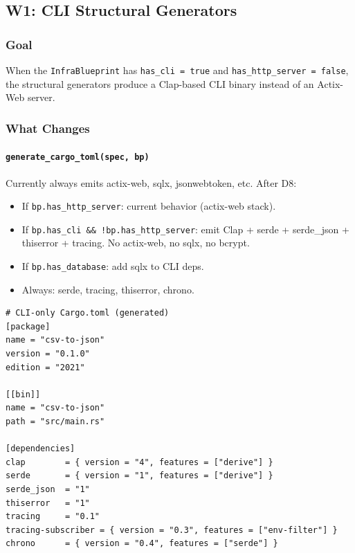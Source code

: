 \documentclass[11pt,a4paper]{article}
\begin{document}
\subsection{W1: CLI Structural Generators}
\label{sec:w1}

\subsubsection{Goal}

When the \texttt{InfraBlueprint} has \texttt{has\_cli = true} and 
\texttt{has\_http\_server = false}, the structural generators produce 
a Clap-based CLI binary instead of an Actix-Web server.

\subsubsection{What Changes}

\paragraph{\texttt{generate\_cargo\_toml(spec, bp)}}

Currently always emits actix-web, sqlx, jsonwebtoken, etc. After D8:

\begin{itemize}[nosep]
\item If \texttt{bp.has\_http\_server}: current behavior (actix-web 
      stack).
\item If \texttt{bp.has\_cli \&\& !bp.has\_http\_server}: emit Clap 
      + serde + serde\_json + thiserror + tracing. No actix-web, 
      no sqlx, no bcrypt.
\item If \texttt{bp.has\_database}: add sqlx to CLI deps.
\item Always: serde, tracing, thiserror, chrono.
\end{itemize}

\begin{lstlisting}[style=toml]
# CLI-only Cargo.toml (generated)
[package]
name = "csv-to-json"
version = "0.1.0"
edition = "2021"

[[bin]]
name = "csv-to-json"
path = "src/main.rs"

[dependencies]
clap        = { version = "4", features = ["derive"] }
serde       = { version = "1", features = ["derive"] }
serde_json  = "1"
thiserror   = "1"
tracing     = "0.1"
tracing-subscriber = { version = "0.3", features = ["env-filter"] }
chrono      = { version = "0.4", features = ["serde"] }
\end{lstlisting}
\end{document}
